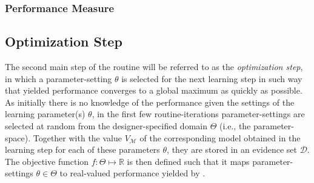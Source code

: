 \subsubsection{Performance Measure}
\label{sec:performance-measure}


\subsection{Optimization Step}
\label{sec:optimization-step}

The second main step of the routine will be referred to as the \textit{optimization step}, in which a parameter-setting $\theta$ is selected for the next learning step in such way that yielded performance converges to a global maximum as quickly as possible.
As initially there is no knowledge of the performance given the settings of the learning parameter(s) $\theta$, in the first few routine-iterations parameter-settings are selected at random from the designer-specified domain $\Theta$ (i.e., the parameter-space).
Together with the value $V_{\mathcal{M}}$ of the corresponding model obtained in the learning step for each of these parameters $\theta$, they are stored in an evidence set $\mathcal{D}$.
The objective function $f: \Theta \mapsto \mathbb{R}$ is then defined such that it maps parameter-settings $\theta \in \Theta$ to real-valued performance yielded by .

